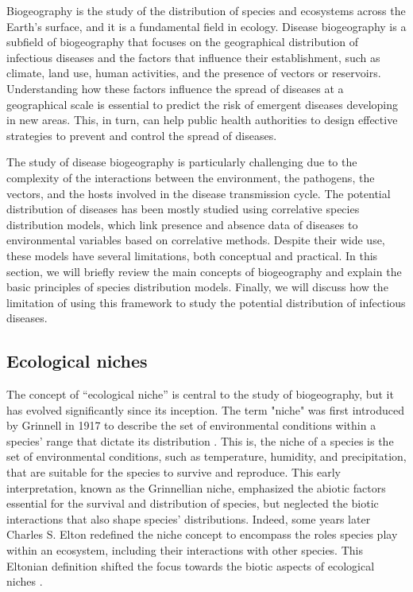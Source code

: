 Biogeography is the study of the distribution of species and ecosystems across
the Earth's surface, and it is a fundamental field in ecology. Disease
biogeography is a subfield of biogeography that focuses on the geographical
distribution of infectious diseases and the factors that influence their
establishment, such as climate, land use, human activities, and the presence of
vectors or reservoirs. Understanding how these factors influence the
spread of diseases at a geographical scale is essential to predict the
risk of emergent diseases developing in new areas. This, in turn, can help
public health authorities to design effective strategies to prevent and control
the spread of diseases.

The study of disease biogeography is particularly challenging due to the
complexity of the interactions between the environment, the pathogens, the
vectors, and the hosts involved in the disease transmission cycle. The
potential distribution of diseases has been mostly studied using correlative
species distribution models, which link presence and absence data of diseases
to environmental variables based on correlative methods. Despite their wide
use, these models have several limitations, both conceptual and practical. In
this section, we will briefly review the main concepts of biogeography and
explain the basic principles of species distribution models. Finally, we will
discuss how the limitation of using this framework to study the potential
distribution of infectious diseases.

\subsection{\label{sec:Ecological niches} Ecological niches}

The concept of ``ecological niche'' is central to the study of biogeography,
but it has evolved significantly since its inception. The term "niche" was
first introduced by Grinnell in 1917 to describe the set of environmental
conditions within a species' range that dictate its distribution
\cite{Grinnell1917}. This is, the niche of a species is the set of
environmental conditions, such as temperature, humidity, and precipitation,
that are suitable for the species to survive and reproduce. This early
interpretation, known as the Grinnellian niche, emphasized the abiotic factors
essential for the survival and distribution of species, but neglected the
biotic interactions that also shape species' distributions. Indeed, some years
later Charles S. Elton redefined the niche concept to encompass the roles
species play within an ecosystem, including their interactions with other
species. This Eltonian definition shifted the focus towards the biotic aspects
of ecological niches \cite{Elton1927}.


